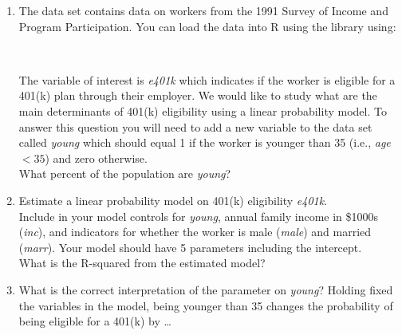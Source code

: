 \begin{enumerate}
\item {}
The data set  contains data on workers from the 1991 Survey of Income and Program Participation. You can load the data into R using the  library using:

\medskip
{}\\
\medskip

The variable of interest is \textit{e401k} which indicates if the worker is eligible for a 401(k) plan through their employer. We would like to study what are the main determinants of 401(k) eligibility using a linear probability model. To answer this question you will need to add a new variable to the data set called \textit{young} which should equal 1 if the worker is younger than 35 (i.e., \textit{age} $<35$) and zero otherwise.\\
What percent of the population are \textit{young}?

\item Estimate a linear probability model on 401(k) eligibility \textit{e401k}.\\
Include in your model controls for \textit{young}, annual family income in \$1000s (\textit{inc}), and indicators for whether the worker is male (\textit{male}) and married (\textit{marr}). Your model should have 5 parameters including the intercept.\\
What is the R-squared from the estimated model?

\item What is the correct interpretation of the parameter on \textit{young}? Holding fixed the variables in the model, being younger than 35 changes the probability of being eligible for a 401(k) by \dots
{}


\end{enumerate}

